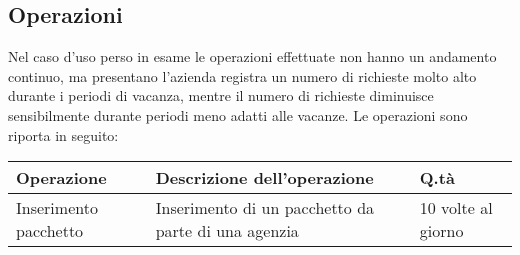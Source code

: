 \subsection{Operazioni}
Nel caso d'uso perso in esame le operazioni effettuate non hanno un andamento continuo, ma presentano l'azienda registra un numero di richieste molto alto durante i periodi di vacanza, mentre il numero di richieste diminuisce sensibilmente durante periodi meno adatti alle vacanze. Le operazioni sono riporta in seguito:
\begin{tabularx}{\textwidth}{X X p{}}
    \toprule
    \textbf{Operazione} & \textbf{Descrizione dell'operazione} & \textbf{Q.tà} \\
    \midrule
    Inserimento pacchetto & Inserimento di un pacchetto da parte di una agenzia & 10 volte al giorno \\

    \bottomrule
\end{tabularx}